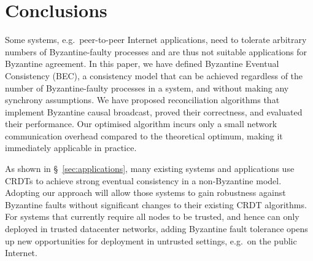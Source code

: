 \documentclass[a4paper,anonymous,USenglish]{lipics-v2019}
\begin{document}





\section{Conclusions}

Some systems, e.g.\ peer-to-peer Internet applications, need to tolerate arbitrary numbers of Byzantine-faulty processes and are thus not suitable applications for Byzantine agreement.
In this paper, we have defined Byzantine Eventual Consistency (BEC), a consistency model that can be achieved regardless of the number of Byzantine-faulty processes in a system, and without making any synchrony assumptions.
We have proposed reconciliation algorithms that implement Byzantine causal broadcast, proved their correctness, and evaluated their performance.
Our optimised algorithm incurs only a small network communication overhead compared to the theoretical optimum, making it immediately applicable in practice.

As shown in \S~\ref{sec:applications}, many existing systems and applications use CRDTs to achieve strong eventual consistency in a non-Byzantine model.
Adopting our approach will allow those systems to gain robustness against Byzantine faults without significant changes to their existing CRDT algorithms.
For systems that currently require all nodes to be trusted, and hence can only deployed in trusted datacenter networks, adding Byzantine fault tolerance opens up new opportunities for deployment in untrusted settings, e.g.\ on the public Internet.
\end{document}
